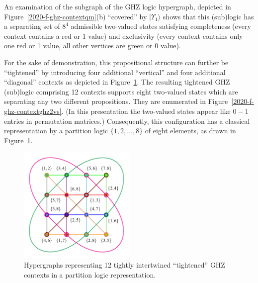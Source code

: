 \documentclass[sn-mathphys]{sn-jnl}%
\theoremstyle{thmstyleone}%
\theoremstyle{thmstyletwo}%
\theoremstyle{thmstylethree}%
\begin{document}
An examination of the subgraph of the GHZ logic hypergraph, depicted in Figure~\ref{2020-f-ghz-contextqm}(b) ``covered'' by $\vert \Upsilon_1 \rangle$
shows that this (sub)logic has a separating set of $8^4$ admissible two-valued states
satisfying completeness (every context contains a red or 1 value) and exclusivity (every context contains only one red or 1 value, all other vertices are green or 0 value).

For the sake of demonstration, this propositional structure can further be
``tightened'' by introducing four additional ``vertical'' and four additional ``diagonal'' contexts as depicted in Figure~\ref{2020-f-ghz-contextpl}.
The resulting tightened GHZ (sub)logic comprising 12 contexts supports eight two-valued states which are separating any two different propositions.
They are enumerated in Figure~\ref{2020-f-ghz-contextghz2vs}.
(In this presentation the two-valued states appear like $0-1$ entries in permutation matrices.)
Consequently, this configuration has a classical
representation by a partition logic $\{1,2,\ldots ,8\}$ of eight elements, as drawn in Figure~\ref{2020-f-ghz-contextpl}.

\begin{figure}[h]%
\begin{center}
\includegraphics[width=0.5\textwidth]{2020-ghz-exfigures-figure2}
\end{center}
\caption{\label{2020-f-ghz-contextpl}
Hypergraphs representing 12 tightly intertwined ``tightened'' GHZ contexts in a partition logic representation.
}
\end{figure}
\end{document}
